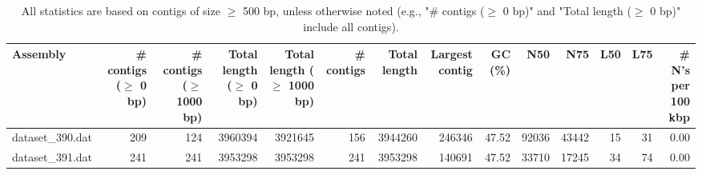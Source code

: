 \documentclass[12pt,a4paper]{article}
\begin{document}
\begin{table}[ht]
\begin{center}
\caption{All statistics are based on contigs of size $\geq$ 500 bp, unless otherwise noted (e.g., "\# contigs ($\geq$ 0 bp)" and "Total length ($\geq$ 0 bp)" include all contigs).}
\begin{tabular}{|l*{13}{|r}|}
\hline
Assembly & \# contigs ($\geq$ 0 bp) & \# contigs ($\geq$ 1000 bp) & Total length ($\geq$ 0 bp) & Total length ($\geq$ 1000 bp) & \# contigs & Total length & Largest contig & GC (\%) & N50 & N75 & L50 & L75 & \# N's per 100 kbp \\ \hline
dataset\_390.dat & 209 & 124 & 3960394 & 3921645 & 156 & 3944260 & 246346 & 47.52 & 92036 & 43442 & 15 & 31 & 0.00 \\ \hline
dataset\_391.dat & 241 & 241 & 3953298 & 3953298 & 241 & 3953298 & 140691 & 47.52 & 33710 & 17245 & 34 & 74 & 0.00 \\ \hline
\end{tabular}
\end{center}
\end{table}
\end{document}
